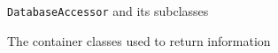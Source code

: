 \begin{figure}[!ht]
\caption{\texttt{DatabaseAccessor} and its subclasses}
\label{fig:dat_dbac}
\end{figure}

\begin{figure}[!ht]
\caption{The container classes used to return information}
\label{fig:dat_containers}
\end{figure}